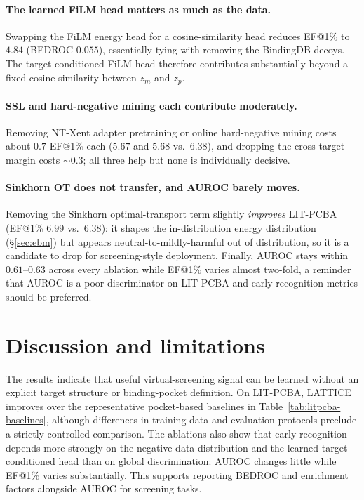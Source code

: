 \documentclass[10pt]{article}
\begin{document}
\paragraph{The learned FiLM head matters as much as the data.}
Swapping the FiLM energy head for a cosine-similarity head reduces EF@1\% to
$4.84$ (BEDROC $0.055$), essentially tying with removing the BindingDB
decoys. The target-conditioned FiLM head therefore contributes substantially
beyond a fixed cosine similarity between $z_m$ and $z_p$.

\paragraph{SSL and hard-negative mining each contribute moderately.}
Removing NT-Xent adapter pretraining or online hard-negative mining costs about
$0.7$ EF@1\% each ($5.67$ and $5.68$ vs.\ $6.38$), and dropping the cross-target
margin costs $\sim\!0.3$; all three help but none is individually decisive.

\paragraph{Sinkhorn OT does not transfer, and AUROC barely moves.}
Removing the Sinkhorn optimal-transport term slightly \emph{improves} LIT-PCBA
(EF@1\% $6.99$ vs.\ $6.38$): it shapes the in-distribution energy distribution
(\S\ref{sec:ebm}) but appears neutral-to-mildly-harmful out of distribution, so it
is a candidate to drop for screening-style deployment. Finally, AUROC stays within
$0.61$--$0.63$ across every ablation while EF@1\% varies almost two-fold, a
reminder that AUROC is a poor discriminator on LIT-PCBA and early-recognition
metrics should be preferred. %

\section{Discussion and limitations}
The results indicate that useful virtual-screening signal can be learned without
an explicit target structure or binding-pocket definition. On LIT-PCBA, LATTICE
improves over the representative pocket-based baselines in
Table~\ref{tab:litpcba-baselines}, although differences in training data and
evaluation protocols preclude a strictly controlled comparison. The ablations
also show that early recognition depends more strongly on the negative-data
distribution and the learned target-conditioned head than on global
discrimination: AUROC changes little while EF@1\% varies substantially. This
supports reporting BEDROC and enrichment factors alongside AUROC for screening
tasks.
\end{document}
